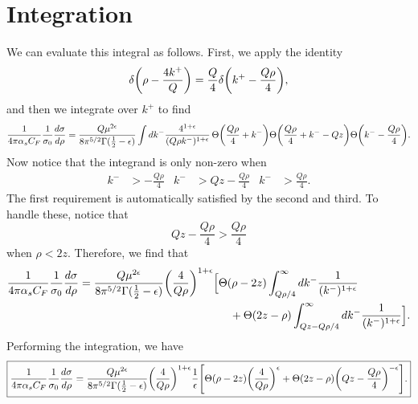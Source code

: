 \documentclass[11pt,twoside,reqno]{amsart}
\theoremstyle{plain}
\theoremstyle{remark}
\theoremstyle{definition}
\theoremstyle{remark}
\theoremstyle{definition}
\theoremstyle{definition}
\begin{document}
\section{Integration}

	We can evaluate this integral as follows. First, we apply the identity
	\begin{equation}
		\delta\qty(\rho - \frac{4 k^+}{Q}) = \frac{Q}{4}\delta\qty(k^+ - \frac{Q\rho}{4}),
	\end{equation}
	and then we integrate over $k^+$ to find
	\begin{equation}
	\begin{aligned}
		\frac{1}{4\pi \alpha_s C_F}\frac{1}{\sigma_0} \frac{d\sigma}{d\rho} = \frac{Q \mu^{2\epsilon}}{8\pi^{5/2}\Gamma(\frac{1}{2} - \epsilon)}
		\int dk^- 
		\frac{4^{1 + \epsilon}}{(Q\rho k^-)^{1 + \epsilon}} \, 
		\Theta\qty(\frac{Q\rho}{4} + k^-) 
		\Theta\qty(\frac{Q\rho}{4} + k^- - Qz)
		\Theta\qty(k^- - \frac{Q\rho}{4}).
	\end{aligned}
	\end{equation}
	Now notice that the integrand is only non-zero when
	\begin{align}
		k^- &> -\frac{Q\rho}{4} & k^- &> Qz - \frac{Q\rho}{4} & k^- &> \frac{Q\rho}{4}.
	\end{align}
	The first requirement is automatically satisfied by the second and third. To handle these, notice that
	\begin{equation}
		Qz - \frac{Q\rho}{4} > \frac{Q\rho}{4}
	\end{equation}
	when $\rho < 2z$. Therefore, we find that
	\begin{equation}
	\begin{aligned}
		\frac{1}{4\pi \alpha_s C_F}\frac{1}{\sigma_0} \frac{d\sigma}{d\rho} = 
		\frac{Q \mu^{2\epsilon}}{8\pi^{5/2}\Gamma(\frac{1}{2} - \epsilon)} \qty(\frac{4}{Q \rho})^{1 + \epsilon} \Big[ & \Theta(\rho - 2z) \int_{Q\rho/4}^\infty dk^- \frac{1}{(k^-)^{1 + \epsilon}} \\
		&\quad + \Theta(2z - \rho) \int_{Qz - Q\rho/4}^\infty dk^- \frac{1}{(k^-)^{1 + \epsilon}} \Big].
	\end{aligned}
	\end{equation}
	Performing the integration, we have
	\begin{equation}\label{eq:integrated cross section}
	\boxed{
	\begin{aligned}
		\frac{1}{4\pi \alpha_s C_F}\frac{1}{\sigma_0} \frac{d\sigma}{d\rho} = 
		\frac{Q \mu^{2\epsilon}}{8\pi^{5/2}\Gamma(\frac{1}{2} - \epsilon)} \qty(\frac{4}{Q \rho})^{1 + \epsilon} \frac{1}{\epsilon} \qty[ \Theta(\rho - 2z) \qty(\frac{4}{Q\rho})^\epsilon + \Theta(2z - \rho) \qty(Qz - \frac{Q\rho}{4})^{-\epsilon} ].
	\end{aligned}
	}
	\end{equation}
\end{document}
